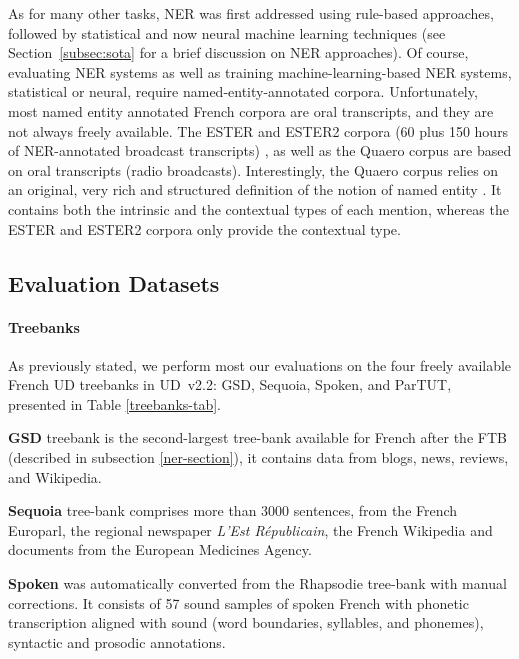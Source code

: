 As for many other tasks, NER was first addressed using rule-based approaches, followed by statistical and now neural machine learning techniques (see Section~\ref{subsec:sota} for a brief discussion on NER approaches). Of course, evaluating NER systems as well as training machine-learning-based NER systems, statistical or neural, require named-entity-annotated corpora. Unfortunately, most named entity annotated French corpora are oral transcripts, and they are not always freely available. The ESTER and ESTER2 corpora (60 plus 150 hours of NER-annotated broadcast transcripts) \citep{galliano-etal-2005-the,galliano-etal-2009-the}, as well as the Quaero \citep{grouin-etal-2011-proposal} corpus are based on oral transcripts (radio broadcasts). Interestingly, the Quaero corpus relies on an original, very rich and structured  definition of the notion of named entity \citep{rosset-etal-2011-entites}. It contains both the intrinsic and the contextual types of each mention, whereas the ESTER and ESTER2 corpora only provide the contextual type.

\subsection{Evaluation Datasets}\label{subsec:evaluation-datasets}

\paragraph{Treebanks}
As previously stated, we perform most our evaluations on the four freely available French UD treebanks in UD~v2.2: GSD, Sequoia, Spoken, and ParTUT, presented in Table \ref{treebanks-tab}.

\textbf{GSD} treebank \citep{mcdonald-etal-2013-universal} is the second-largest tree-bank available for French after the FTB (described in subsection \ref{ner-section}), it contains data from blogs, news, reviews, and Wikipedia.

\textbf{Sequoia} tree-bank \citep{candito-etal-2014-deep} comprises more than 3000 sentences, from the French Europarl, the regional newspaper \emph{L’Est Républicain}, the French Wikipedia and documents from the European Medicines Agency.

\textbf{Spoken} was automatically converted from the Rhapsodie tree-bank \citep{lacheret-etal-2014-rhapsodie} with manual corrections. It consists of 57 sound samples of spoken French with phonetic transcription aligned with sound (word boundaries, syllables, and phonemes), syntactic and prosodic annotations.

